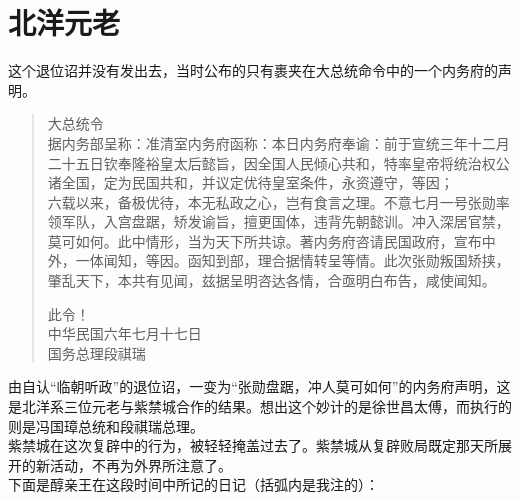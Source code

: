 \fancyhead[RO]{} %
\fancyhead[LE]{} %
\chapter*{北洋元老}
\thispagestyle{empty}
这个退位诏并没有发出去，当时公布的只有裹夹在大总统命令中的一个内务府的声明。\\

\begin{quote}
	大总统令\\

据内务部呈称：准清室内务府函称：本日内务府奉谕：前于宣统三年十二月二十五日钦奉隆裕皇太后懿旨，因全国人民倾心共和，特率皇帝将统治权公诸全国，定为民国共和，并议定优待皇室条件，永资遵守，等因；\\

六载以来，备极优待，本无私政之心，岂有食言之理。不意七月一号张勋率领军队，入宫盘踞，矫发谕旨，擅更国体，违背先朝懿训。冲入深居官禁，莫可如何。此中情形，当为天下所共谅。著内务府咨请民国政府，宣布中外，一体闻知，等因。函知到部，理合据情转呈等情。此次张勋叛国矫挟，肇乱天下，本共有见闻，兹据呈明咨达各情，合亟明白布告，咸使闻知。\\

\begin{flushright}
	此令！\\

中华民国六年七月十七日\\

国务总理段祺瑞
\end{flushright}
\end{quote}

由自认“临朝听政”的退位诏，一变为“张勋盘踞，冲人莫可如何”的内务府声明，这是北洋系三位元老与紫禁城合作的结果。想出这个妙计的是徐世昌太傅，而执行的则是冯国璋总统和段祺瑞总理。\\

紫禁城在这次复辟中的行为，被轻轻掩盖过去了。紫禁城从复辟败局既定那天所展开的新活动，不再为外界所注意了。\\

下面是醇亲王在这段时间中所记的日记（括弧内是我注的）：\\

